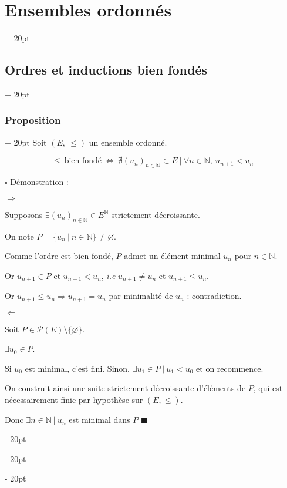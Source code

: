\documentclass[a4paper, 12pt, twoside]{article}
\newcommand{\N}{\mathbb{N}} %
\newcommand{\ssi}{\ \Leftrightarrow \ }
\renewcommand{\le}{\leqslant}
\newcommand{\ind}[1][20pt]{\advance\leftskip + #1}
\newcommand{\deind}[1][20pt]{\advance\leftskip - #1}
\newenvironment{indt}[2][20pt]{#2 \par \ind[#1]}{\par \deind} %
\begin{document}
\begin{indt}{\section{Ensembles ordonnés}}
\begin{indt}{\subsection{Ordres et inductions bien fondés}}
            \vspace{6pt}
            
            \begin{indt}{\subsubsection{Proposition}}
                Soit $(E,\ \le)$ un ensemble ordonné.
                
                \[ \le\ \text{bien fondé} \ssi \nexists (u_n)_{n \in \N} \subset E\ |\ \forall n \in \N,\ u_{n + 1} < u_n \]
                
                \newpage
                
                $\square$ Démonstration :
                
                $\Rightarrow$
                
                Supposons $\exists (u_n)_{n \in \N} \in E^\N$ strictement décroissante.
                
                On note $P = \{u_n\ |\ n \in \N\} \neq \varnothing$.
                
                Comme l'ordre est bien fondé, $P$ admet un élément minimal $u_n$ pour $n \in \N$.
                
                Or $u_{n + 1} \in P$ et $u_{n + 1} < u_n$, \textit{i.e} $u_{n + 1} \neq u_n$ et $u_{n + 1} \le u_n$.
                
                Or $u_{n + 1} \le u_n \Rightarrow u_{n + 1} = u_n$ par minimalité de $u_n$ : contradiction.
                
                \vspace{6pt}
                
                $\Leftarrow$
                
                Soit $P \in \mathcal P(E) \setminus \{\varnothing\}$.
                
                $\exists u_0 \in P$.
                
                Si $u_0$ est minimal, c'est fini. Sinon, $\exists u_1 \in P\ |\ u_1 < u_0$ et on recommence.
                
                On construit ainsi une suite strictement décroissante d'éléments de $P$, qui est nécessairement finie par hypothèse sur $(E, \le)$.
                
                Donc $\exists n \in \N\ |\ u_n$ est minimal dans $P$
                $\blacksquare$
            \end{indt}
            

\end{indt}
\end{indt}
\end{document}
